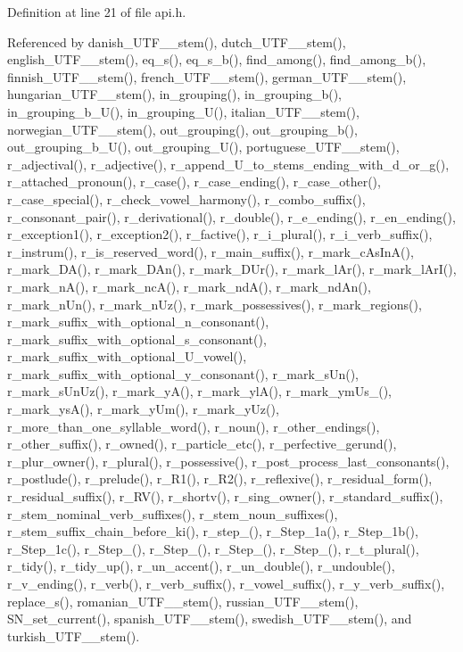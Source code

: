 Definition at line 21 of file api.h.

Referenced by danish\_\-UTF\_\_\-stem(), dutch\_\-UTF\_\_\-stem(), english\_\-UTF\_\_\-stem(), eq\_\-s(), eq\_\-s\_\-b(), find\_\-among(), find\_\-among\_\-b(), finnish\_\-UTF\_\_\-stem(), french\_\-UTF\_\_\-stem(), german\_\-UTF\_\_\-stem(), hungarian\_\-UTF\_\_\-stem(), in\_\-grouping(), in\_\-grouping\_\-b(), in\_\-grouping\_\-b\_\-U(), in\_\-grouping\_\-U(), italian\_\-UTF\_\_\-stem(), norwegian\_\-UTF\_\_\-stem(), out\_\-grouping(), out\_\-grouping\_\-b(), out\_\-grouping\_\-b\_\-U(), out\_\-grouping\_\-U(), portuguese\_\-UTF\_\_\-stem(), r\_\-adjectival(), r\_\-adjective(), r\_\-append\_\-U\_\-to\_\-stems\_\-ending\_\-with\_\-d\_\-or\_\-g(), r\_\-attached\_\-pronoun(), r\_\-case(), r\_\-case\_\-ending(), r\_\-case\_\-other(), r\_\-case\_\-special(), r\_\-check\_\-vowel\_\-harmony(), r\_\-combo\_\-suffix(), r\_\-consonant\_\-pair(), r\_\-derivational(), r\_\-double(), r\_\-e\_\-ending(), r\_\-en\_\-ending(), r\_\-exception1(), r\_\-exception2(), r\_\-factive(), r\_\-i\_\-plural(), r\_\-i\_\-verb\_\-suffix(), r\_\-instrum(), r\_\-is\_\-reserved\_\-word(), r\_\-main\_\-suffix(), r\_\-mark\_\-cAsInA(), r\_\-mark\_\-DA(), r\_\-mark\_\-DAn(), r\_\-mark\_\-DUr(), r\_\-mark\_\-lAr(), r\_\-mark\_\-lArI(), r\_\-mark\_\-nA(), r\_\-mark\_\-ncA(), r\_\-mark\_\-ndA(), r\_\-mark\_\-ndAn(), r\_\-mark\_\-nUn(), r\_\-mark\_\-nUz(), r\_\-mark\_\-possessives(), r\_\-mark\_\-regions(), r\_\-mark\_\-suffix\_\-with\_\-optional\_\-n\_\-consonant(), r\_\-mark\_\-suffix\_\-with\_\-optional\_\-s\_\-consonant(), r\_\-mark\_\-suffix\_\-with\_\-optional\_\-U\_\-vowel(), r\_\-mark\_\-suffix\_\-with\_\-optional\_\-y\_\-consonant(), r\_\-mark\_\-sUn(), r\_\-mark\_\-sUnUz(), r\_\-mark\_\-yA(), r\_\-mark\_\-ylA(), r\_\-mark\_\-ymUs\_\-(), r\_\-mark\_\-ysA(), r\_\-mark\_\-yUm(), r\_\-mark\_\-yUz(), r\_\-more\_\-than\_\-one\_\-syllable\_\-word(), r\_\-noun(), r\_\-other\_\-endings(), r\_\-other\_\-suffix(), r\_\-owned(), r\_\-particle\_\-etc(), r\_\-perfective\_\-gerund(), r\_\-plur\_\-owner(), r\_\-plural(), r\_\-possessive(), r\_\-post\_\-process\_\-last\_\-consonants(), r\_\-postlude(), r\_\-prelude(), r\_\-R1(), r\_\-R2(), r\_\-reflexive(), r\_\-residual\_\-form(), r\_\-residual\_\-suffix(), r\_\-RV(), r\_\-shortv(), r\_\-sing\_\-owner(), r\_\-standard\_\-suffix(), r\_\-stem\_\-nominal\_\-verb\_\-suffixes(), r\_\-stem\_\-noun\_\-suffixes(), r\_\-stem\_\-suffix\_\-chain\_\-before\_\-ki(), r\_\-step\_(), r\_\-Step\_\-1a(), r\_\-Step\_\-1b(), r\_\-Step\_\-1c(), r\_\-Step\_(), r\_\-Step\_(), r\_\-Step\_(), r\_\-Step\_(), r\_\-t\_\-plural(), r\_\-tidy(), r\_\-tidy\_\-up(), r\_\-un\_\-accent(), r\_\-un\_\-double(), r\_\-undouble(), r\_\-v\_\-ending(), r\_\-verb(), r\_\-verb\_\-suffix(), r\_\-vowel\_\-suffix(), r\_\-y\_\-verb\_\-suffix(), replace\_\-s(), romanian\_\-UTF\_\_\-stem(), russian\_\-UTF\_\_\-stem(), SN\_\-set\_\-current(), spanish\_\-UTF\_\_\-stem(), swedish\_\-UTF\_\_\-stem(), and turkish\_\-UTF\_\_\-stem().\hypertarget{structSN__env_73c996c34c706b1c11a4b3b273d99f35}{
}
